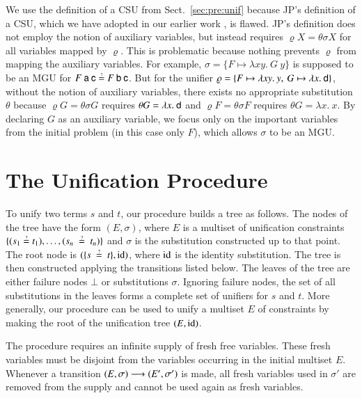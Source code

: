 We use the definition of a CSU from Sect.~\ref{sec:pre:unif} because 
JP's definition of a CSU, which we have adopted in our earlier work \cite{vbn-21-unif}, is flawed.
JP's definition does not employ the notion of auxiliary variables,
but instead requires $\varrho X = \theta\sigma X$ for all variables mapped by $\varrho$.
This is problematic because nothing prevents $\varrho$ from mapping the auxiliary variables.
For example, $\sigma = \{F \mapsto \lambda x y.\> G\>y\}$ is supposed
to be an MGU for $F\>\cst{a}\>\cst{c} \unif F\>\cst{b}\>\cst{c}$.
But for the unifier $\varrho = \{F \mapsto \lambda x y.\> y,\> G \mapsto \lambda x.\> \mathsf{d}\}$,
without the notion of auxiliary variables,
there exists no appropriate substitution $\theta$
because $\varrho G = \theta\sigma G$ requires $\theta G = \lambda x.\> \mathsf{d}$
and $\varrho F = \theta\sigma F$ requires $\theta G = \lambda x.\> x$. By declaring $G$ as an auxiliary variable,
we focus only on the important variables from the initial problem (in this case only $F$),
which allows $\sigma$ to be an MGU.



\section{The Unification Procedure}
\label{sec:unif:the-unification-procedure}

To unify two terms $s$ and $t$, our procedure builds a tree as follows. The
nodes of the tree have the form $(E,\sigma)$, where $E$ is a multiset of
unification constraints $\{(s_1 \unif t_1), \ldots, (s_n~\unif~t_n)\}$ and
$\sigma$ is the substitution constructed up to that point.  The root node is $(\{s~\unif~t\}, \makeop{id})$, where $\operatorname{id}$ is the identity
substitution. The tree is then constructed applying the transitions listed
below. The leaves of the tree are either failure nodes  $\bot$ or substitutions
$\sigma$. Ignoring failure nodes, the set of all substitutions in the leaves
forms a complete set of unifiers for $s$ and $t$. More generally, our procedure can be used to
unify a multiset $E$ of constraints by making the root of the unification tree
$(E, \operatorname{id})$.

The procedure requires an infinite supply of fresh free variables. These fresh
variables must be disjoint from the variables occurring in the initial multiset
$E$. Whenever a transition $(E,\sigma) \longrightarrow (E',\sigma')$ is made, all
fresh variables used in $\sigma'$ are removed from the supply and cannot be used
again as fresh variables.

